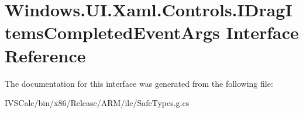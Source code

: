 \hypertarget{interface_windows_1_1_u_i_1_1_xaml_1_1_controls_1_1_i_drag_items_completed_event_args}{}\section{Windows.\+U\+I.\+Xaml.\+Controls.\+I\+Drag\+Items\+Completed\+Event\+Args Interface Reference}
\label{interface_windows_1_1_u_i_1_1_xaml_1_1_controls_1_1_i_drag_items_completed_event_args}


The documentation for this interface was generated from the following file\+:\begin{DoxyCompactItemize}
\item 
I\+V\+S\+Calc/bin/x86/\+Release/\+A\+R\+M/ilc/Safe\+Types.\+g.\+cs\end{DoxyCompactItemize}
